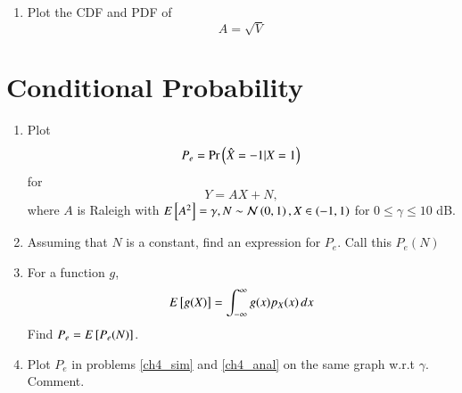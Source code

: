 \documentclass[journal,12pt,twocolumn]{IEEEtran}
\renewcommand\thesection{\arabic{section}}
\begin{document}
\begin{enumerate}[label=\thesection.\arabic*
,ref=\thesection.\theenumi]
Now, since 
\begin{align}
    f_{r, \theta}(r, \theta) &= |J|f_{X_1, X_2}(x_1, x_2)      \\   
\intertext{we have:}     
f_{R, \theta}(r, \theta) & = \frac{r}{2\pi} e^{-\frac{r^2}{2}}                                                    
\end{align}

Therefore, 
\begin{align}
    f_R(r)                   & = \int_0^{2\pi} f_{R, \theta}(r, \theta)                                                     \\
    & = \int_0^{2\pi} \frac{r}{2\pi} e^{-\frac{r^2}{2}} d\theta                                    \\
    & = r e^{-\frac{r^2}{2}}                                                                       \\
\end{align}



\item
\label{ch3_raleigh_sim}
Plot the CDF and PDF of
%
\begin{equation}
A = \sqrt{V}
\end{equation}
%
\end{enumerate}
\section{Conditional Probability}
\begin{enumerate}[label=\thesection.\arabic*
,ref=\thesection.\theenumi]
\item
\label{ch4_sim}
Plot 
\begin{equation}
P_e = \Pr\left(\hat{X} = -1|X=1\right)
\end{equation}
%
for 
\begin{equation}
Y = AX+N,
\end{equation}
where $A$ is Raleigh with $E{}\left[A^2\right] = \gamma, N \sim \mathcal{N}\left(0,1\right), X \in \left(-1,1\right)$ for $0 \le \gamma \le 10$ dB.
%
\item
Assuming that $N$ is a constant, find an expression for $P_e$.  Call this $P_e(N)$
%
\item
%
\label{ch4_anal}
For a function $g$,
\begin{equation}
E{}\left[g(X)\right] = \int_{-\infty}^{\infty}g(x)p_{X}(x)\, dx
\end{equation}
%
Find $P_e = E{}\left[P_e(N)\right]$.
%
\item
Plot $P_e$ in problems \ref{ch4_sim} and \ref{ch4_anal} on the same graph w.r.t $\gamma$.  Comment.
		\end{enumerate}
\end{document}

